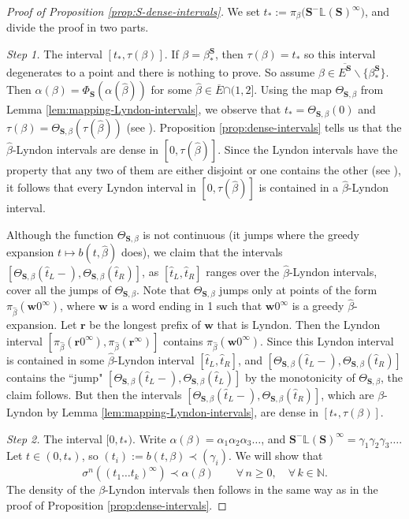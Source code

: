 \documentclass[11pt]{amsart}
\theoremstyle{definition}
\theoremstyle{remark}
\numberwithin{equation}{section}
\newcommand{\N}{\ensuremath{\mathbb{N}}}
\renewcommand{\L}{\ensuremath{\mathbb{L}}}
\newcommand{\cs}{ {\mathbf{S}}}
\renewcommand{\r}{ {\mathbf{r}}}
\newcommand{\w}{\mathbf{w}}
\newcommand{\f}{\infty}
\newcommand{\al}{\alpha}
\newcommand{\si}{\sigma}
\begin{document}
\begin{proof}[Proof of Proposition \ref{prop:S-dense-intervals}]
We set $t_*:=\pi_\beta\big(\cs^-\L(\cs)^\f\big)$, and divide the proof in two parts.

\medskip
{\em Step 1.} The interval $[t_*,\tau(\beta)]$. If $\beta=\beta_*^\cs$, then $\tau(\beta)=t_*$ so this interval degenerates to a point and there is nothing to prove. So assume $\beta\in \overline{E^\cs}\backslash \{\beta_*^\cs\}$. Then $\alpha(\beta)=\Phi_\cs(\alpha(\hat{\beta}))$ for some $\hat{\beta}\in \overline{E}{\cap(1,2]}$. Using the map $\Theta_{\cs,\beta}$ from Lemma \ref{lem:mapping-Lyndon-intervals}, we observe that $t_*=\Theta_{\cs,\beta}(0)$ and $\tau(\beta)=\Theta_{\cs,\beta}(\tau(\hat{\beta}))$ (see { \cite[Theorem 3.4]{Allaart-Kong-2024}}). Proposition \ref{prop:dense-intervals} tells us that the $\hat{\beta}$-Lyndon intervals are dense in $[0,\tau(\hat{\beta})]$. Since the Lyndon intervals have the property that any two of them are either disjoint or one contains the other (see \cite[Proposition 4.1]{Kalle-Kong-Langeveld-Li-18}), it follows that every Lyndon interval in $[0,\tau(\hat{\beta})]$ is contained in a $\hat{\beta}$-Lyndon interval.

Although the function $\Theta_{\cs,\beta}$ is not continuous (it jumps where the greedy expansion $t\mapsto b(t,\hat{\beta})$ does), we claim that the intervals $[\Theta_{\cs,\beta}(\hat{t}_L-),\Theta_{\cs,\beta}(\hat{t}_R)]$, as $[\hat{t}_L,\hat{t}_R]$ ranges over the $\hat{\beta}$-Lyndon intervals, cover all the jumps of $\Theta_{\cs,\beta}$. Note that $\Theta_{\cs,\beta}$ jumps only at points of the form $\pi_{\hat\beta}(\w 0^\f)$, where $\w$ is a word ending in 1 such that $\w 0^\f$ is a greedy $\hat{\beta}$-expansion. Let $\r$ be the longest prefix of $\w$ that is Lyndon. Then the Lyndon interval $[\pi_{\hat\beta}(\r0^\f),\pi_{\hat\beta}(\r^\f)]$ contains $\pi_{\hat\beta}(\w0^\f)$. Since this Lyndon interval is contained in some $\hat{\beta}$-Lyndon interval $[\hat{t}_L,\hat{t}_R]$, and $[\Theta_{\cs,\beta}(\hat{t}_L-),\Theta_{\cs,\beta}(\hat{t}_R)]$ contains the ``jump" $[\Theta_{\cs,\beta}(\hat{t}_L-),\Theta_{\cs,\beta}(\hat{t}_L)]$ by {the monotonicity of $\Theta_{\cs,\beta}$}, the claim follows. But then the intervals $[\Theta_{\cs,\beta}(\hat{t}_L-),\Theta_{\cs,\beta}(\hat{t}_R)]$, which are $\beta$-Lyndon by Lemma \ref{lem:mapping-Lyndon-intervals}, are dense in $[t_*,\tau(\beta)]$.

\medskip
{\em Step 2.} The interval $[0,t_*)$. %
Write $\alpha(\beta)=\alpha_1\alpha_2\alpha_3\dots$, and $\cs^-\L(\cs)^\f=\gamma_1\gamma_2\gamma_3\dots$. Let $t\in (0,t_*)$, so $(t_i):=b(t,\beta)\prec (\gamma_i)$. We will show that
\[
\si^n((t_1\dots t_k)^\f)\prec \al(\beta) \qquad \forall\,n\geq 0, \quad \forall\,k\in\N.
\]
The density of the $\beta$-Lyndon intervals then follows in the same way as in the proof of Proposition \ref{prop:dense-intervals}.


\end{proof}
\end{document}
